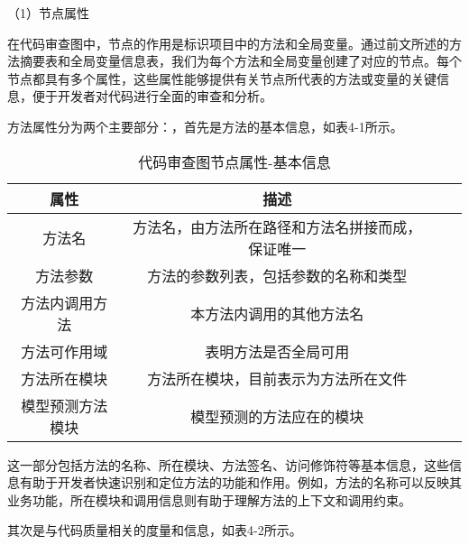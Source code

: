 （1）节点属性

在代码审查图中，节点的作用是标识项目中的方法和全局变量。通过前文所述的方法摘要表和全局变量信息表，我们为每个方法和全局变量创建了对应的节点。每个节点都具有多个属性，这些属性能够提供有关节点所代表的方法或变量的关键信息，便于开发者对代码进行全面的审查和分析。

方法属性分为两个主要部分：，首先是方法的基本信息，如表4-1所示。

\begin{table}[htbp]
\caption{代码审查图节点属性-基本信息}
\vspace{0.5em}\centering\wuhao
\begin{tabular}{cccc}
\toprule
    属性 & 描述 \\
\midrule
方法名 & 方法名，由方法所在路径和方法名拼接而成，保证唯一  \\
方法参数 & 方法的参数列表，包括参数的名称和类型   \\
方法内调用方法 & 本方法内调用的其他方法名   \\
方法可作用域 & 表明方法是否全局可用   \\
方法所在模块 &  方法所在模块，目前表示为方法所在文件  \\
模型预测方法模块 & 模型预测的方法应在的模块   \\     
\bottomrule
\end{tabular}
\end{table}

这一部分包括方法的名称、所在模块、方法签名、访问修饰符等基本信息，这些信息有助于开发者快速识别和定位方法的功能和作用。例如，方法的名称可以反映其业务功能，所在模块和调用信息则有助于理解方法的上下文和调用约束。

其次是与代码质量相关的度量和信息，如表4-2所示。

